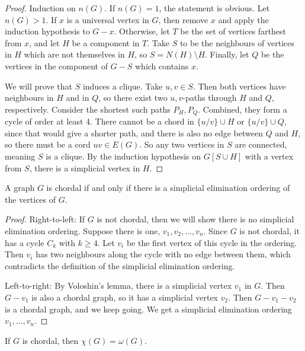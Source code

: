 \begin{proof}
  Induction on $n(G)$.
  If $n(G) = 1$, the statement is obvious.
  Let $n(G) > 1$.
  If $x$ is a universal vertex in $G$, then remove $x$ and apply the induction
  hypothesis to $G-x$.
  Otherwise, let $T$ be the set of vertices farthest from $x$, and let $H$ be a
  component in $T$.
  Take $S$ to be the neighbours of vertices in $H$ which are not themselves in
  $H$, so $S = N(H) \setminus H$.
  Finally, let $Q$ be the vertices in the component of $G-S$ which contains $x$.

  We will prove that $S$ induces a clique.
  Take $u, v \in S$.
  Then both vertices have neighbours in $H$ and in $Q$, so there exist two
  $u,v$-paths through $H$ and $Q$, respectively.
  Consider the shortest such paths $P_H, P_Q$.
  Combined, they form a cycle of order at least $4$.
  There cannot be a chord in $\{u/v\} \cup H$ or $\{u/v\} \cup Q$, since that
  would give a shorter path, and there is also no edge between $Q$ and $H$, so
  there must be a cord $uv \in E(G)$.
  So any two vertices in $S$ are connected, meaning $S$ is a clique.
  By the induction hypothesis on $G[S \cup H]$ with a vertex from $S$, there is
  a simplicial vertex in $H$.
\end{proof}

\begin{theorem}
  A graph $G$ is chordal if and only if there is a simplicial elimination
  ordering of the vertices of $G$.
\end{theorem}

\begin{proof}
  Right-to-left:
  If $G$ is not chordal, then we will show there is no simplicial elimination
  ordering.
  Suppose there is one, $v_1, v_2, \ldots, v_n$.
  Since $G$ is not chordal, it has a cycle $C_k$ with $k \ge 4$.
  Let $v_i$ be the first vertex of this cycle in the ordering.
  Then $v_i$ has two neighbours along the cycle with no edge between them, which
  contradicts the definition of the simplicial elimination ordering.

  Left-to-right:
  By Voloshin's lemma, there is a simplicial vertex $v_1$ in $G$.
  Then $G - v_1$ is also a chordal graph, so it has a simplicial vertex $v_2$.
  Then $G - v_1 - v_2$ is a chordal graph, and we keep going.
  We get a simplicial elimination ordering $v_1, \ldots, v_n$.
\end{proof}

\begin{theorem}
  If $G$ is chordal, then $\chi(G) = \omega(G)$.
\end{theorem}

